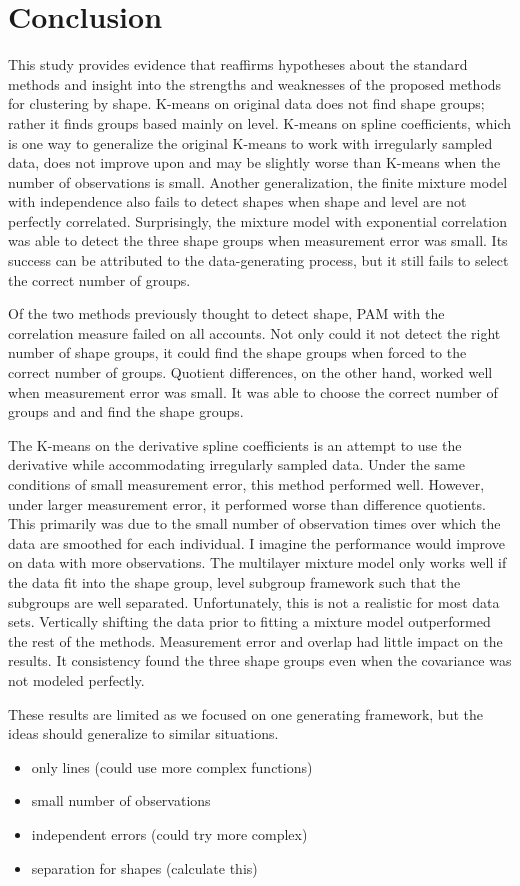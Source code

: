 \section{Conclusion}
This study provides evidence that reaffirms hypotheses about the standard methods and insight into the strengths and weaknesses of the proposed methods for clustering by shape. K-means on original data does not find shape groups; rather it finds groups based mainly on level. K-means on spline coefficients, which is one way to generalize the original K-means to work with irregularly sampled data, does not improve upon and may be slightly worse than K-means when the number of observations is small. Another generalization, the finite mixture model with independence also fails to detect shapes when shape and level are not perfectly correlated. Surprisingly, the mixture model with exponential correlation was able to detect the three shape groups when measurement error was small. Its success can be attributed to the data-generating process, but it still fails to select the correct number of groups.

Of the two methods previously thought to detect shape, PAM with the correlation measure failed on all accounts. Not only could it not detect the right number of shape groups, it could find the shape groups when forced to the correct number of groups. Quotient differences, on the other hand, worked well when measurement error was small. It was able to choose the correct number of groups and and find the shape groups.

The K-means on the derivative spline coefficients is an attempt to use the derivative while accommodating irregularly sampled data. Under the same conditions of small measurement error, this method performed well. However, under larger measurement error, it performed worse than difference quotients. This primarily was due to the small number of observation times over which the data are smoothed for each individual. I imagine the performance would improve on data with more observations.  The multilayer mixture model only works well if the data fit into the shape group, level subgroup framework such that the subgroups are well separated. Unfortunately, this is not a realistic for most data sets. Vertically shifting the data prior to fitting a mixture model outperformed the rest of the methods. Measurement error and overlap had little impact on the results. It consistency found the three shape groups even when the covariance was not modeled perfectly.

These results are limited as we focused on one generating framework, but the ideas should generalize to similar situations. 
\begin{itemize}
\item only lines (could use more complex functions) 
\item small number of observations 
\item independent errors (could try more complex)
\item separation for shapes (calculate this)
\end{itemize}


